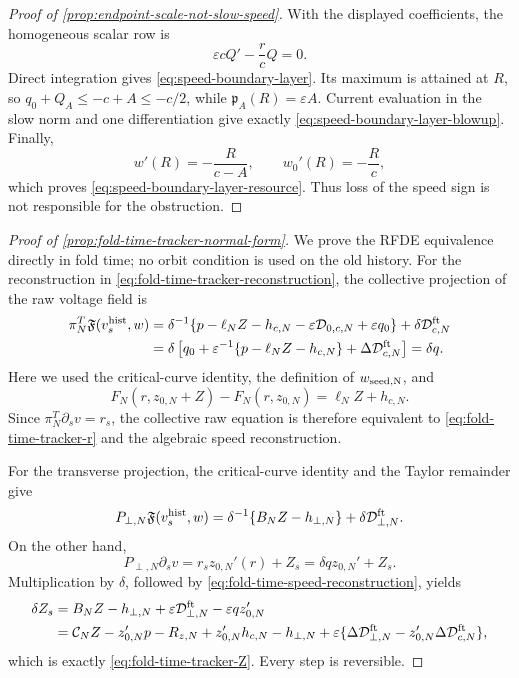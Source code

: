 \begin{proof}[Proof of \cref{prop:endpoint-scale-not-slow-speed}]
With the displayed coefficients, the homogeneous scalar row is
\[
 \varepsilon cQ'-\frac r cQ=0.
\]
Direct integration gives \cref{eq:speed-boundary-layer}.  Its maximum is
attained at \(R\), so \(q_0+Q_A\le-c+A\le-c/2\), while
\(\mathfrak p_A(R)=\varepsilon A\).  Current evaluation in the slow norm and
one differentiation give exactly
\cref{eq:speed-boundary-layer-blowup}.  Finally,
\[
 w'(R)=-\frac R{c-A},\qquad w_0'(R)=-\frac Rc,
\]
which proves \cref{eq:speed-boundary-layer-resource}.  Thus loss of the
speed sign is not responsible for the obstruction.
\end{proof}

\begin{proof}[Proof of \cref{prop:fold-time-tracker-normal-form}]
We prove the RFDE equivalence directly in fold time; no orbit condition is
used on the old history.  For the reconstruction in
\cref{eq:fold-time-tracker-reconstruction}, the collective projection of
the raw voltage field is
\begin{align}
 \pi_N^T\mathfrak F(v_s^{\rm hist},w)
 ={}&\delta^{-1}
   \{p-\ell_NZ-h_{c,N}
          -\varepsilon\mathcal D_{0,c,N}
          +\varepsilon q_0\}
       +\delta\mathcal D_{c,N}^{\rm ft}\notag\\
 ={}&\delta\left[
 q_0+\varepsilon^{-1}\{p-\ell_NZ-h_{c,N}\}
       +\Delta\mathcal D_{c,N}^{\rm ft}\right]
 =\delta q.                                       \label{eq:fold-time-direct-collective}
\end{align}
Here we used the critical-curve identity, the definition of
\(w_{\rm seed,N}\), and
\[
 F_N(r,z_{0,N}+Z)-F_N(r,z_{0,N})
 =\ell_NZ+h_{c,N}.
\]
Since \(\pi_N^T\partial_sv=r_s\), the collective raw equation is therefore
equivalent to \cref{eq:fold-time-tracker-r} and the algebraic speed
reconstruction.

For the transverse projection, the critical-curve identity and the Taylor
remainder give
\begin{equation}
 P_{\perp,N}\mathfrak F(v_s^{\rm hist},w)
 =\delta^{-1}\{B_NZ-h_{\perp,N}\}
       +\delta\mathcal D_{\perp,N}^{\rm ft}.       \label{eq:fold-time-direct-transverse}
\end{equation}
On the other hand,
\[
 P_{\perp,N}\partial_sv=r_sz_{0,N}'(r)+Z_s
               =\delta qz_{0,N}'+Z_s.
\]
Multiplication by \(\delta\), followed by
\cref{eq:fold-time-speed-reconstruction}, yields
\begin{align*}
 \delta Z_s
 &=B_NZ-h_{\perp,N}
       +\varepsilon\mathcal D_{\perp,N}^{\rm ft}
       -\varepsilon qz_{0,N}'\\
 &=\mathcal C_NZ-z_{0,N}'p-R_{z,N}
       +z_{0,N}'h_{c,N}-h_{\perp,N}
       +\varepsilon\{\Delta\mathcal D_{\perp,N}^{\rm ft}
                 -z_{0,N}'\Delta\mathcal D_{c,N}^{\rm ft}\},
\end{align*}
which is exactly \cref{eq:fold-time-tracker-Z}.  Every step is reversible.


\end{proof}
